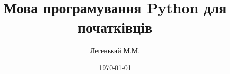 



\usepackage{cmap}					%
\usepackage{mathtext} 				%
\usepackage[T2A]{fontenc}			%
\usepackage[utf8]{inputenc}			%
\usepackage[english,ukrainian]{babel}	%

\usepackage{hyperref}

\usepackage{graphicx}  %
\graphicspath{{images/}{images2/}}  %
\setlength\fboxsep{3pt} %
\setlength\fboxrule{1pt} %
\usepackage{wrapfig} %

\usepackage{array,tabularx,tabulary,booktabs} %
\usepackage{longtable}  %
\usepackage{multirow} %

\usepackage{etoolbox} %

\usepackage{lastpage} %
\usepackage{soul} %
\usepackage{csquotes} %
\usepackage{multicol} %

\usepackage{tikz} %
\usepackage{pgfplots}
\usepackage{pgfplotstable}

\title[Python]{Мова програмування Python для початківців}
\author{Легенький М.М.}
\date{\today}

